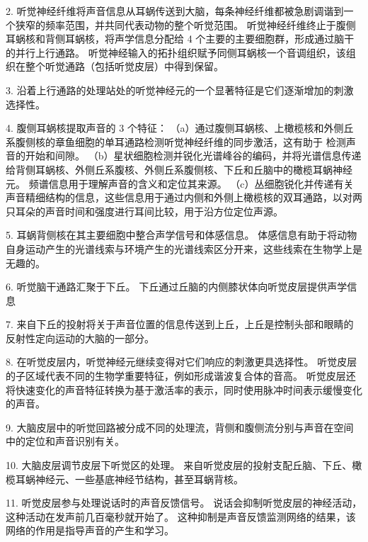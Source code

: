 2. 听觉神经纤维将声音信息从耳蜗传送到大脑，每条神经纤维都被急剧调谐到一个狭窄的频率范围，并共同代表动物的整个听觉范围。
听觉神经纤维终止于腹侧耳蜗核和背侧耳蜗核，将声学信息分配给 4 个主要的主要细胞群，形成通过脑干的并行上行通路。
听觉神经输入的拓扑组织赋予同侧耳蜗核一个音调组织，该组织在整个听觉通路（包括听觉皮层）中得到保留。


3. 沿着上行通路的处理站处的听觉神经元的一个显著特征是它们逐渐增加的刺激选择性。


4. 腹侧耳蜗核提取声音的 3 个特征：
（a）通过腹侧耳蜗核、上橄榄核和外侧丘系腹侧核的章鱼细胞的单耳通路检测听觉神经纤维的同步激活，这有助于 检测声音的开始和间隙。
（b）星状细胞检测并锐化光谱峰谷的编码，并将光谱信息传递给背侧耳蜗核、外侧丘系腹核、外侧丘系腹侧核、下丘和丘脑中的橄榄耳蜗神经元。 
频谱信息用于理解声音的含义和定位其来源。 
（c）丛细胞锐化并传递有关声音精细结构的信息，这些信息用于通过内侧和外侧上橄榄核的双耳通路，以对两只耳朵的声音时间和强度进行耳间比较，用于沿方位定位声源。


5. 耳蜗背侧核在其主要细胞中整合声学信号和体感信息。
体感信息有助于将动物自身运动产生的光谱线索与环境产生的光谱线索区分开来，这些线索在生物学上是无趣的。


6. 听觉脑干通路汇聚于下丘。
下丘通过丘脑的内侧膝状体向听觉皮层提供声学信息

 

7. 来自下丘的投射将关于声音位置的信息传送到上丘，上丘是控制头部和眼睛的反射性定向运动的大脑的一部分。 

8. 在听觉皮层内，听觉神经元继续变得对它们响应的刺激更具选择性。
听觉皮层的子区域代表不同的生物学重要特征，例如形成谐波复合体的音高。
听觉皮层还将快速变化的声音特征转换为基于激活率的表示，同时使用脉冲时间表示缓慢变化的声音。


9. 大脑皮层中的听觉回路被分成不同的处理流，背侧和腹侧流分别与声音在空间中的定位和声音识别有关。 

10. 大脑皮层调节皮层下听觉区的处理。
来自听觉皮层的投射支配丘脑、下丘、橄榄耳蜗神经元、一些基底神经节结构，甚至耳蜗背核。


11. 听觉皮层参与处理说话时的声音反馈信号。
说话会抑制听觉皮层的神经活动，这种活动在发声前几百毫秒就开始了。
这种抑制是声音反馈监测网络的结果，该网络的作用是指导声音的产生和学习。


